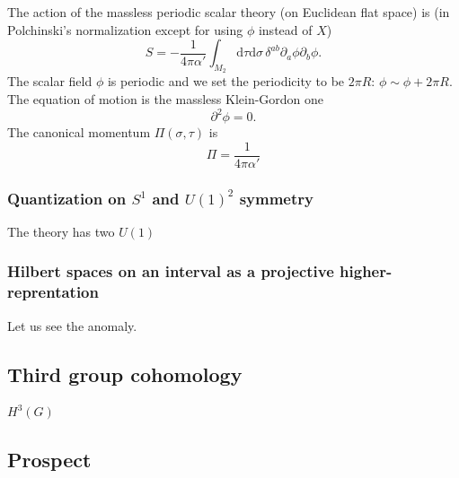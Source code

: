 \documentclass[
]{scrartcl}
\numberwithin{equation}{section}
\theoremstyle{definition}
\theoremstyle{definition}
\theoremstyle{definition}
\theoremstyle{definition}
\theoremstyle{remark}
\begin{document}
The action of the massless periodic scalar theory (on Euclidean flat space) is (in Polchinski's normalization except for using \(\phi\) instead of \(X\))
\begin{equation}
    \label{eq:Sphi}
    S = -\frac{1}{4\pi\alpha'}\int_{M_2} \mathrm{d}\tau\mathrm{d}\sigma \,\delta^{ab}\partial_a \phi \partial_b \phi.
\end{equation}
The scalar field \(\phi\) is periodic and we set the periodicity to be \(2\pi R\): \(\phi \sim \phi + 2\pi R\).
The equation of motion is the massless Klein-Gordon one
\begin{equation}
    \label{eq:EOMphi}
    \partial^2 \phi = 0.
\end{equation}
The canonical momentum \(\Pi(\sigma,\tau)\) is
\begin{equation}
    \label{eq:momentum}
    \Pi = \frac{1}{4\pi \alpha'} 
\end{equation}

\hypertarget{quantization-on-s1-and-u12-symmetry}{%
\subsubsection{\texorpdfstring{Quantization on \(S^1\) and \(U(1)^2\) symmetry}{Quantization on S\^{}1 and U(1)\^{}2 symmetry}}\label{quantization-on-s1-and-u12-symmetry}}

The theory has two \(U(1)\)

\hypertarget{hilbert-spaces-on-an-interval-as-a-projective-higher-reprentation}{%
\subsubsection{Hilbert spaces on an interval as a projective higher-reprentation}\label{hilbert-spaces-on-an-interval-as-a-projective-higher-reprentation}}

Let us see the anomaly.

\hypertarget{third-group-cohomology}{%
\subsection{Third group cohomology}\label{third-group-cohomology}}

\(H^3(G)\)

\hypertarget{prospect}{%
\subsection{Prospect}\label{prospect}}

\printbibliography
\end{document}
